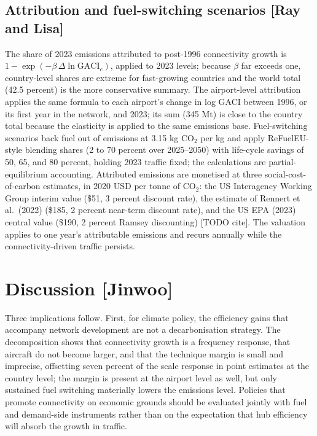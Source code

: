 \documentclass[12pt]{article}
\begin{document}
\subsection*{Attribution and fuel-switching scenarios [Ray and Lisa]}
The share of 2023 emissions attributed to post-1996 connectivity growth is
$1 - \exp(-\beta\,\Delta \ln \mathrm{GACI}_c)$, applied to 2023 levels;
because $\beta$ far exceeds one, country-level shares are extreme for
fast-growing countries and the world total (42.5 percent) is the more
conservative summary. The airport-level attribution applies the same
formula to each airport's change in log GACI between 1996, or its first
year in the network, and 2023; its sum (345 Mt) is close to the country
total because the elasticity is applied to the same emissions base. Fuel-switching scenarios back fuel out of emissions
at 3.15 kg CO$_2$ per kg and apply ReFuelEU-style blending shares (2 to 70
percent over 2025--2050) with life-cycle savings of 50, 65, and 80 percent,
holding 2023 traffic fixed; the calculations are partial-equilibrium
accounting. Attributed emissions are monetised at three
social-cost-of-carbon estimates, in 2020 USD per tonne of CO$_2$: the US
Interagency Working Group interim value (\$51, 3 percent discount rate),
the estimate of Rennert et al.\ (2022) (\$185, 2 percent near-term
discount rate), and the US EPA (2023) central value (\$190, 2 percent
Ramsey discounting) [TODO cite]. The valuation applies to one year's
attributable emissions and recurs annually while the connectivity-driven
traffic persists.

\section*{Discussion [Jinwoo]}
Three implications follow. First, for climate policy, the efficiency gains
that accompany network development are not a decarbonisation strategy. The
decomposition shows that connectivity growth is a frequency response, that
aircraft do not become larger, and that the technique margin is small and
imprecise, offsetting seven percent of the scale response in point
estimates at the country level; the margin is present
at the airport level as well, but only sustained fuel switching materially
lowers the emissions level. Policies that promote connectivity on economic
grounds should be evaluated jointly with fuel and demand-side instruments
rather than on the expectation that hub efficiency will absorb the growth
in traffic.
\end{document}
